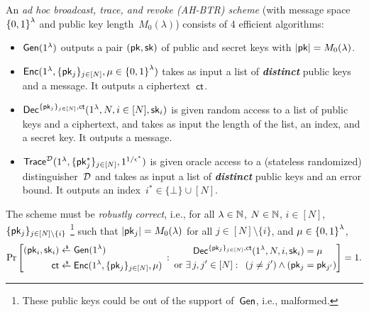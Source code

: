 \begin{definition}[AH-BTR]\label{def:ahbtr}
An \emph{ad hoc broadcast, trace, and revoke (AH-BTR) scheme}
(with message space~${\{0,1\}}^\lambda$ and public key length~$M_0(\lambda)$)
consists of 4 efficient algorithms:
\begin{itemize}
\item $\Gen(1^\lambda)$ outputs a pair $(\pk,\sk)$ of public and secret keys
with ${|\pk|=M_0(\lambda)}$.
\item $\Enc(1^\lambda,\{\pk_j\}_{j\in[N]},{\mu\in\bit^\lambda})$
takes as input
a list of \textit{\textbf{distinct}} public keys and a message.
It outputs a ciphertext~$\ct$.
\item $\Dec^{\{\pk_j\}_{j\in[N]},\ct}(1^\lambda,N,i\in[N],\sk_i)$
is given random access to a list of public keys and a ciphertext, and
takes as input
the length of the list,
an index, and
a secret key.
It outputs a message.
\item $\Trace^\scriptD(1^\lambda,\{\pk^\ast_j\}_{j\in[N]},1^{1/\epsilon^\ast})$
is given oracle access to a (stateless randomized) distinguisher~${\mathcal{D}}$ and takes as input
a list of \textit{\textbf{distinct}} public keys and an error bound.
It outputs an index~${i^\ast\in\{\bot\}\cup[N]}$.
\end{itemize}
The scheme must be \emph{robustly correct}, i.e., for all
${\lambda\in{\mathbb{N}}}$,
${N\in{\mathbb{N}}}$,
${i\in[N]}$,\WideNarrow{}{\linebreak[4]}
$\{\pk_j\}_{j\in[N]\setminus\{i\}}$%
\footnote{These public keys could be out of the support of~$\Gen$,
i.e., malformed.}
such that ${|\pk_j|=M_0(\lambda)}$ for all ${j\in[N]\setminus\{i\}}$, and
${\mu\in{\{0,1\}}^\lambda}$,
\begin{align*}
\Pr\left[
\begin{aligned}
(
\WideNarrow{}{{}&}
\pk_i,\sk_i)
\WideNarrow{&{}}{}
\draws\Gen(1^\lambda)\\
\WideNarrow{}{&}
\ct
\WideNarrow{&{}}{}
\draws\Enc(1^\lambda,\{\pk_j\}_{j\in[N]},\mu)
\end{aligned}
\::\:
\begin{aligned}
\Dec^{\{\pk_j\}_{j\in[N]},\ct}(1^\lambda,N,i,\sk_i)&{}=\mu
\\\textup{or }\exists\, j,j'\in[N]:\WideNarrow{\,\ }{}
(j\neq j')\wedge(\pk_j&{}=\pk_{j'})
\end{aligned}
\right]=1.
\end{align*}
\end{definition}
